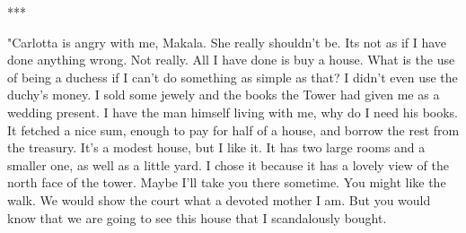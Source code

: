 \documentclass{article}
\begin{document}
\begin{comment}
I struggled with myself for days. Had I really just declaired, even to myself, my infidelity to the gods of my birth? I had felt no strong love for them, this is true, but aloofness and disloyalty are two very different stands. I needed to know more about the gods that ruled the lands south of the Pensid Mountains. I wondered if Makala had stood in this very temple and been moved beyond words at the hints that a different set of gods could be better than the ones we held dear. It was treachery of the worst kind. The constant demanding allure of the thought was stronger than anything I had ever experienced. It was stronger than my youthful desire to see the world beyond my father's lands, stronger than my desperate need to be alone with my duke during those first heady days of our love, stronger even than the despair that led me to climb Mount Turin, only to be rescued by a vigilant goatherd's wife. To think the gods of Marsea inferior was to think that everything my family loved to be inferior to that of this strange new land that did not know me. My father, though I could not tell him my situation, did not deserve that disrespect. And yet. The image of two warriors meeting their enemies arm in arm, back to back, what could Makala and I not have accomplished together if we had been allowed on the battlefield as one. Who would fight more fiercely to protect his duke than I, if only I could have stated why I fought. After three days of indecision and turmoil I decided that I needed to know the stories of these gods. 

When I asked in court \end{comment}

***

"Carlotta is angry with me, Makala. She really shouldn't be. Its not as if I have done anything wrong. Not really. All I have done is buy a house. What is the use of being a duchess if I can't do something as simple as that? I didn't even use the duchy's money. I sold some jewely and the books the Tower had given me as a wedding present. I have the man himself living with me, why do I need his books. It fetched a nice sum, enough to pay for half of a house, and borrow the rest from the treasury. It's a modest house, but I like it. It has two large rooms and a smaller one, as well as a little yard. I chose it because it has a lovely view of the north face of the tower. Maybe I'll take you there sometime. You might like the walk. We would show the court what a devoted mother I am. But  you would know that we are going to see this house that I scandalously bought. 
\end{document}
